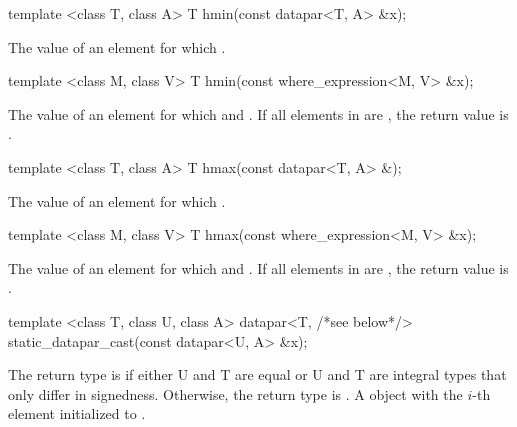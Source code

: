 \begin{itemdecl}
template <class T, class A> T hmin(const datapar<T, A> &x);
\end{itemdecl}
\begin{itemdescr}
  \pnum\returns The value of an element  for which  \foralli.
\end{itemdescr}

\begin{itemdecl}
template <class M, class V> T hmin(const where_expression<M, V> &x);
\end{itemdecl}
\begin{itemdescr}
  \pnum\returns The value of an element  for which  and  \foralli.
  \pnum\remarks If all elements in  are \false, the return value is .
\end{itemdescr}

\begin{itemdecl}
template <class T, class A> T hmax(const datapar<T, A> &);
\end{itemdecl}
\begin{itemdescr}
  \pnum\returns The value of an element  for which  \foralli.
\end{itemdescr}

\begin{itemdecl}
template <class M, class V> T hmax(const where_expression<M, V> &x);
\end{itemdecl}
\begin{itemdescr}
  \pnum\returns The value of an element  for which  and  \foralli.
  \pnum\remarks If all elements in  are \false, the return value is .
\end{itemdescr}


\begin{itemdecl}
template <class T, class U, class A>
datapar<T, /*see below*/> static_datapar_cast(const datapar<U, A> &x);
\end{itemdecl}
\begin{itemdescr}
  \pnum\remarks The return type is \datapar[<T, A>] if either \type U and \type T are equal or \type U and \type T are integral types that only differ in signedness.
  Otherwise, the return type is .
  \pnum\returns A \datapar object with the $i$-th element initialized to .
\end{itemdescr}


